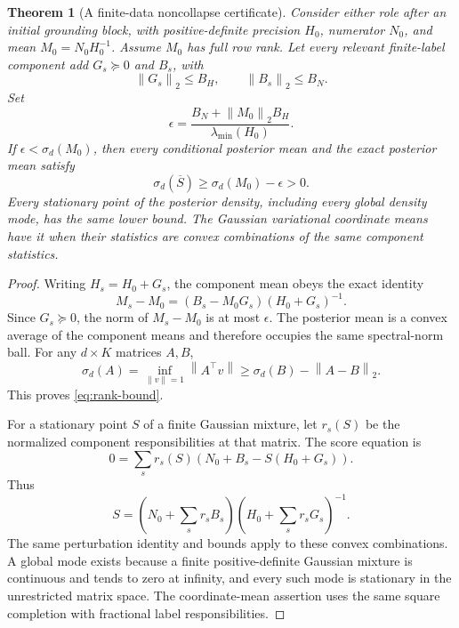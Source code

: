 \documentclass[11pt]{article}
\newtheorem{theorem}{Theorem}[section]
\theoremstyle{definition}
\theoremstyle{remark}
\newcommand{\norm}[1]{\left\lVert #1\right\rVert}
\begin{document}
\begin{theorem}[A finite-data noncollapse certificate]
Consider either role after an initial grounding block, with positive-definite precision \(H_0\), numerator \(N_0\), and mean \(M_0=N_0H_0^{-1}\). Assume \(M_0\) has full row rank. Let every relevant finite-label component add \(G_s\succeq0\) and \(B_s\), with
\[
\norm{G_s}_2\le B_H,\qquad \norm{B_s}_2\le B_N.
\]
Set
\begin{equation}
\epsilon=
\frac{B_N+\norm{M_0}_2B_H}{\lambda_{\min}(H_0)}.
\label{eq:radius}
\end{equation}
If \(\epsilon<\sigma_d(M_0)\), then every conditional posterior mean and the exact posterior mean satisfy
\begin{equation}
\sigma_d(\overline S)\ge\sigma_d(M_0)-\epsilon>0.
\label{eq:rank-bound}
\end{equation}
Every stationary point of the posterior density, including every global density mode, has the same lower bound. The Gaussian variational coordinate means have it when their statistics are convex combinations of the same component statistics.
\label{thm:noncollapse}
\end{theorem}
\begin{proof}
Writing \(H_s=H_0+G_s\), the component mean obeys the exact identity
\begin{equation}
M_s-M_0=(B_s-M_0G_s)(H_0+G_s)^{-1}.
\label{eq:perturbation}
\end{equation}
Since \(G_s\succeq0\), the norm of \(M_s-M_0\) is at most \(\epsilon\). The posterior mean is a convex average of the component means and therefore occupies the same spectral-norm ball. For any \(d\times K\) matrices \(A,B\),
\[
\sigma_d(A)
=
\inf_{\norm{v}=1}\norm{A^\top v}
\ge
\sigma_d(B)-\norm{A-B}_2.
\]
This proves \eqref{eq:rank-bound}.

For a stationary point \(S\) of a finite Gaussian mixture, let \(r_s(S)\) be the normalized component responsibilities at that matrix. The score equation is
\[
0=\sum_sr_s(S)\left(N_0+B_s-S(H_0+G_s)\right).
\]
Thus
\[
S=
\left(N_0+\sum_sr_sB_s\right)
\left(H_0+\sum_sr_sG_s\right)^{-1}.
\]
The same perturbation identity and bounds apply to these convex combinations. A global mode exists because a finite positive-definite Gaussian mixture is continuous and tends to zero at infinity, and every such mode is stationary in the unrestricted matrix space. The coordinate-mean assertion uses the same square completion with fractional label responsibilities.
\end{proof}
\end{document}

